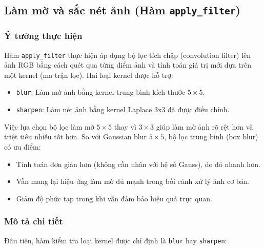 \subsection{Làm mờ và sắc nét ảnh (Hàm \texttt{apply\_filter})}

\subsubsection*{Ý tưởng thực hiện}

Hàm \texttt{apply\_filter} thực hiện áp dụng bộ lọc tích chập (convolution filter) lên ảnh RGB bằng cách quét qua từng điểm ảnh và tính toán giá trị mới dựa trên một kernel (ma trận lọc). Hai loại kernel được hỗ trợ:
\begin{itemize}
  \item \texttt{blur}: Làm mờ ảnh bằng kernel trung bình kích thước \(5 \times 5\).
  \item \texttt{sharpen}: Làm nét ảnh bằng kernel Laplace 3x3 đã được điều chỉnh.
\end{itemize}

Việc lựa chọn bộ lọc làm mờ \(5 \times 5\) thay vì \(3 \times 3\) giúp làm mờ ảnh rõ rệt hơn và triệt tiêu nhiễu tốt hơn. So với Gaussian blur \(5 \times 5\), bộ lọc trung bình (box blur) có ưu điểm:
\begin{itemize}
  \item Tính toán đơn giản hơn (không cần nhân với hệ số Gauss), do đó nhanh hơn.
  \item Vẫn mang lại hiệu ứng làm mờ đủ mạnh trong bối cảnh xử lý ảnh cơ bản.
  \item Giảm độ phức tạp trong khi vẫn đảm bảo hiệu quả trực quan.
\end{itemize}

\subsubsection*{Mô tả chi tiết}

Đầu tiên, hàm kiểm tra loại kernel được chỉ định là \texttt{blur} hay \texttt{sharpen}:

